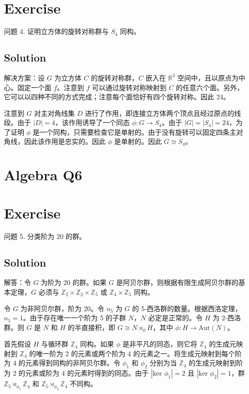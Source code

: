 \documentclass[12pt]{book}
\begin{document}
\section*{Exercise}
问题 4. 证明立方体的旋转对称群与 $S_4$ 同构。



\subsection*{Solution}
解决方案：设 $G$ 为立方体 $C$ 的旋转对称群，$C$ 嵌入在 $\mathbb{R}^3$ 空间中，且以原点为中心。固定一个面 $f$。注意到 $f$ 可以通过旋转对称映射到 $C$ 的任意六个面。另外，它可以以四种不同的方式完成；注意每个面恰好有四个旋转对称。因此 24。

注意到 $G$ 对主对角线集 $D$ 进行了作用，即连接立方体两个顶点且经过原点的线段。由于 $|D| = 4$，该作用诱导了一个同态 $\phi: G \to S_4$。由于 $|G| = |S_4| = 24$，为了证明 $\phi$ 是一个同构，只需要检查它是单射的。由于没有旋转可以固定四条主对角线，因此该作用是忠实的。因此 $\phi$ 是单射的。因此 $G \cong S_4$。
\newpage
\section{Algebra Q6}
\section*{Exercise}
问题 5. 分类阶为 20 的群。



\subsection*{Solution}
解答：令 $G$ 为阶为 20 的群。如果 $G$ 是阿贝尔群，则根据有限生成阿贝尔群的基本定理，$G$ 必须与 $\mathbb{Z}_2 \times \mathbb{Z}_2 \times \mathbb{Z}_5$ 或 $\mathbb{Z}_4 \times \mathbb{Z}_5$ 同构。

令 $G$ 为非阿贝尔群，阶为 20。令 $n_5$ 为 $G$ 的 5-西洛群的数量。根据西洛定理，$n_5 = 1$。由于存在唯一一个阶为 5 的子群 $N$，$N$ 必定是正常的。令 $H$ 为 2-西洛群。则 $G$ 是 $N$ 和 $H$ 的半直接积，即 $G \cong N \rtimes_{\phi} H$，其中 $\phi: H \to \text{Aut}(N)$。

首先假设 $H$ 与循环群 $\mathbb{Z}_4$ 同构。如果 $\phi$ 是非平凡的同态，则它将 $\mathbb{Z}_4$ 的生成元映射到 $\mathbb{Z}_4$ 的唯一阶为 2 的元素或两个阶为 4 的元素之一。将生成元映射到每个阶为 4 的元素得到同构的非阿贝尔群。令 $\phi_1$ 和 $\phi_2$ 分别为当 $\mathbb{Z}_4$ 的生成元映射到阶为 2 的元素或阶为 4 的元素时得到的同态。由于 $|\text{ker } \phi_1| = 2$ 且 $|\text{ker } \phi_2| = 1$，群 $\mathbb{Z}_5 \rtimes_{\phi_1} \mathbb{Z}_4$ 和 $\mathbb{Z}_5 \rtimes_{\phi_2} \mathbb{Z}_4$ 不同构。
\end{document}
